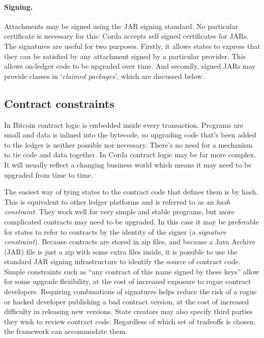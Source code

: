 \documentclass{article}
\begin{document}
\paragraph{Signing.}Attachments may be signed using the JAR signing standard. No particular certificate is
necessary for this: Corda accepts self signed certificates for JARs. The signatures are useful for two purposes.
Firstly, it allows states to express that they can be satisfied by any attachment signed by a particular provider.
This allows on-ledger code to be upgraded over time. And secondly, signed JARs may provide classes in
`\emph{claimed packages}', which are discussed below.

\subsection{Contract constraints}\label{sec:contract-constraints}

In Bitcoin contract logic is embedded inside every transaction. Programs are small and data is inlined into the
bytecode, so upgrading code that's been added to the ledger is neither possible nor necessary. There's no need for
a mechanism to tie code and data together. In Corda contract logic may be far more complex. It will usually reflect
a changing business world which means it may need to be upgraded from time to time.

The easiest way of tying states to the contract code that defines them is by hash. This is equivalent to other
ledger platforms and is referred to as an \emph{hash constraint}. They work well for very simple and stable
programs, but more complicated contracts may need to be upgraded. In this case it may be preferable for states to
refer to contracts by the identity of the signer (a \emph{signature constraint}). Because contracts are stored in
zip files, and because a Java Archive (JAR) file is just a zip with some extra files inside, it is possible to use
the standard JAR signing infrastructure to identify the source of contract code. Simple constraints such as ``any
contract of this name signed by these keys'' allow for some upgrade flexibility, at the cost of increased exposure
to rogue contract developers. Requiring combinations of signatures helps reduce the risk of a rogue or hacked
developer publishing a bad contract version, at the cost of increased difficulty in releasing new versions. State
creators may also specify third parties they wish to review contract code. Regardless of which set of tradeoffs is
chosen, the framework can accommodate them.
\end{document}
